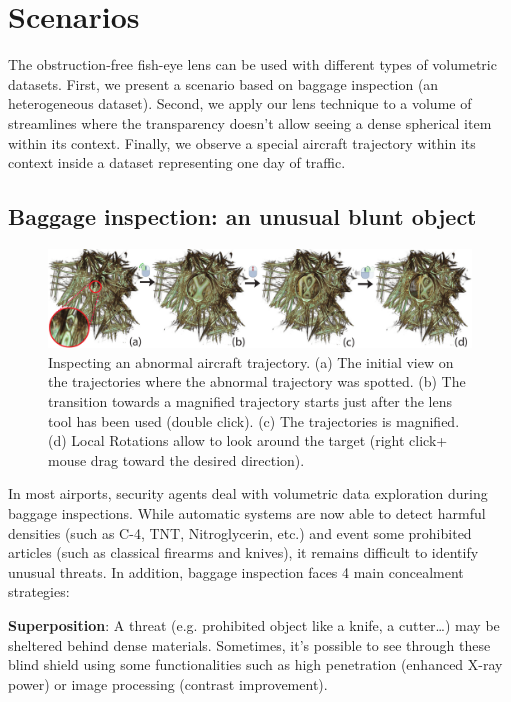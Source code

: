 \section{Scenarios}


The obstruction-free fish-eye lens can be used with different types of volumetric datasets. First, we present a scenario based on baggage inspection (an heterogeneous dataset). Second, we apply our lens technique to a volume of streamlines where the transparency doesn't allow seeing a dense spherical item within its context. Finally, we observe  a special aircraft trajectory within its context inside a dataset representing one day of traffic.

\subsection{Baggage inspection: an unusual blunt object}

\begin{figure} 
\includegraphics [width=\textwidth]{images/aircraft_lens.pdf} 
\caption{Inspecting an abnormal aircraft trajectory. (a) The initial view on the trajectories where the abnormal trajectory was spotted. (b) The transition  towards a magnified trajectory starts just after the lens tool has been used (double click). (c) The trajectories is magnified. (d) Local Rotations allow to look around the target (right click+ mouse drag toward the desired direction).}
\label{f:aircraft_lens}
\end{figure}
In most airports, security agents deal with volumetric data exploration during baggage inspections. While automatic systems are now able to detect harmful densities (such as  C-4, TNT, Nitroglycerin, etc.) and event some prohibited articles (such as classical firearms and knives), it remains difficult to identify unusual threats. In addition, baggage inspection faces 4 main concealment strategies:

\textbf{Superposition}: A threat (e.g. prohibited object like a knife, a cutter…) may be sheltered behind dense materials. Sometimes, it’s possible to see through these blind shield using some functionalities such as high penetration (enhanced X-ray power) or image processing (contrast improvement). 

